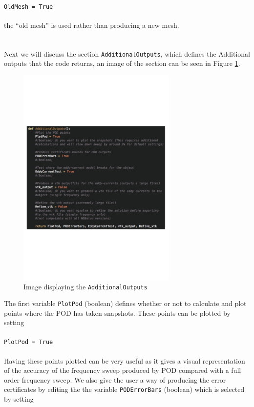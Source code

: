 \\
\texttt{OldMesh = True}\\
\\
the ``old mesh'' is used rather than producing a new mesh.\\
\\
\\
\noindent
Next we will discuss the section \texttt{AdditionalOutputs}, which defines the Additional outputs that the code returns, an image of the section can be seen in Figure \ref{fig:AdditionalOutputs.py}.
\begin{figure}[H]
\begin{center}
\includegraphics[width=0.7\textwidth]{Figures/AdditionalOutputs}
\caption{Image displaying the \texttt{AdditionalOutputs}}\label{fig:AdditionalOutputs.py}
\end{center}
\end{figure}
\noindent
The first variable \texttt{PlotPod} (boolean) defines whether or not to calculate and plot points where the POD has taken snapshots. These points can be plotted by setting\\
\\
\texttt{PlotPod = True}\\
\\
Having these points plotted can be very useful as it gives a visual representation of the accuracy of the frequency sweep produced by POD compared with a full order frequency sweep. We also give the user a way of producing the error certificates by editing the the variable \texttt{PODErrorBars} (boolean) which is selected by setting\\
